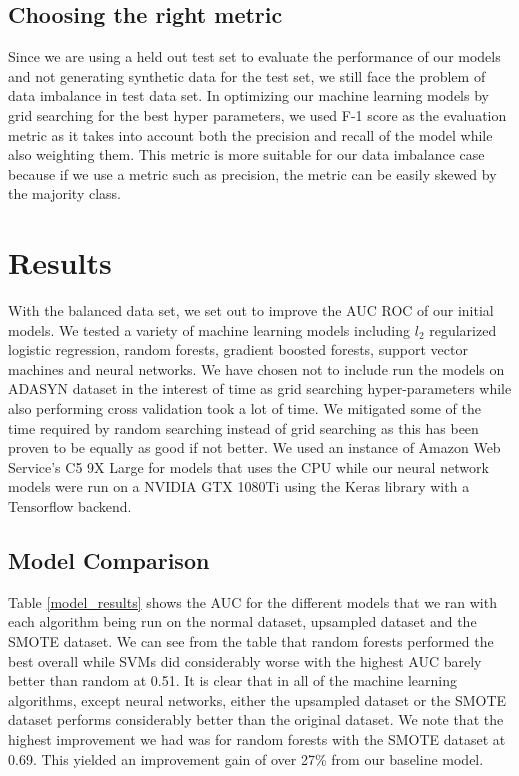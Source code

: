 \documentclass[twoside,11pt]{article}
\begin{document}
\subsection*{Choosing the right metric}
Since we are using a held out test set to evaluate the performance of our
models and not generating synthetic data for the test set, we still face the
problem of data imbalance in test data set. In optimizing our machine learning
models by grid searching for the best hyper parameters, we used F-1 score as the
evaluation metric as it takes into account both the precision and recall of the
model while also weighting them. This metric is more suitable for our data
imbalance case because if we use a metric such as precision, the metric can be
easily skewed by the majority class.

\section{Results} 
With the balanced data set, we set out to improve the AUC ROC of our initial
models. We tested a variety of machine learning models including $l_2$
regularized logistic regression, random forests, gradient boosted forests,
support vector machines and neural networks. We have chosen not to include run
the models on ADASYN dataset in the interest of time as grid searching
hyper-parameters while also performing cross validation took a lot of time. We
mitigated some of the time required by random searching instead of grid
searching as this has been proven to be equally as good if not better. 
We used an instance of Amazon Web Service's C5 9X Large for models that uses the
CPU while our neural network models were run on a NVIDIA GTX 1080Ti using the Keras
library with a Tensorflow backend.
\subsection*{Model Comparison}

Table \ref{model_results} shows the AUC for the different models that we ran with
each algorithm being run on the normal dataset, upsampled dataset and the SMOTE
dataset. We can see from the table that random forests performed the best
overall while SVMs did considerably worse with the highest AUC barely better
than random at 0.51. It is clear that in all of the machine learning algorithms,
except neural networks, either the upsampled dataset or the SMOTE dataset
performs considerably better than the original dataset. We note that the highest
improvement we had was for random forests with the SMOTE dataset at 0.69. This
yielded an improvement gain of over 27\% from our baseline model.
\end{document}
